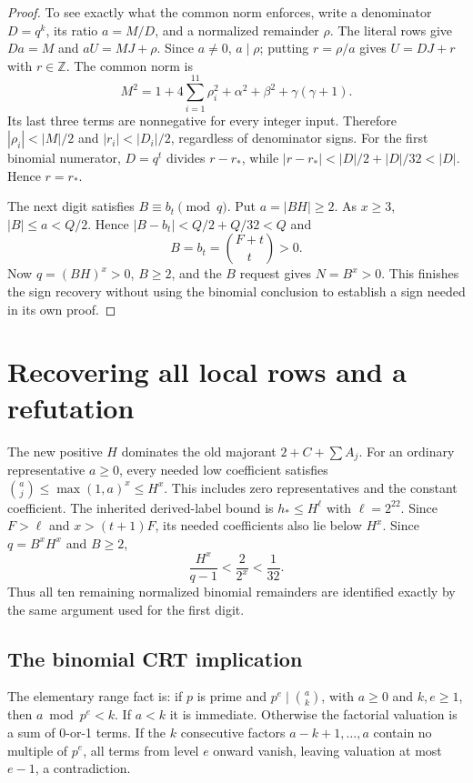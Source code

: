 \documentclass[11pt]{article}
\begin{document}
\begin{proof}
To see exactly what the common norm enforces, write a denominator
$D=q^k$, its ratio $a=M/D$, and a normalized remainder $\rho$.
The literal rows give $Da=M$ and $aU=MJ+\rho$. Since $a\ne0$,
$a\mid\rho$; putting $r=\rho/a$ gives $U=DJ+r$ with $r\in\mathbb Z$.
The common norm is
\begin{equation}\label{eq:common}
 M^2=1+4\sum_{i=1}^{11}\rho_i^2+\alpha^2+\beta^2+\gamma(\gamma+1).
\end{equation}
Its last three terms are nonnegative for every integer input. Therefore
$|\rho_i|<|M|/2$ and $|r_i|<|D_i|/2$, regardless of denominator signs.
For the first binomial numerator, $D=q^t$ divides $r-r_*$, while
$|r-r_*|<|D|/2+|D|/32<|D|$. Hence $r=r_*$.

The next digit satisfies $B\equiv b_t\pmod q$. Put $a=|BH|\ge2$.
As $x\ge3$, $|B|\le a<Q/2$. Hence
$|B-b_t|<Q/2+Q/32<Q$ and
\begin{equation}\label{eq:binomial}
 B=b_t=\binom{F+t}{t}>0.
\end{equation}
Now $q=(BH)^x>0$, $B\ge2$, and the $B$ request gives $N=B^x>0$.
This finishes the sign recovery without using the binomial conclusion
to establish a sign needed in its own proof.
\end{proof}

\section{Recovering all local rows and a refutation}\label{sec:sound}

The new positive $H$ dominates the old majorant $2+C+\sum A_j$.
For an ordinary representative $a\ge0$, every needed low coefficient
satisfies $\binom aj\le\max(1,a)^x\le H^x$. This includes zero
representatives and the constant coefficient. The inherited derived-label
bound is $h_*\le H^{\ell}$ with $\ell=2^{22}$. Since $F>\ell$ and
$x>(t+1)F$, its needed coefficients also lie below $H^x$.
Since $q=B^xH^x$ and $B\ge2$,
\[
 \frac{H^x}{q-1}<\frac{2}{2^x}<\frac1{32}.
\]
Thus all ten remaining normalized binomial remainders are identified
exactly by the same argument used for the first digit.

\subsection{The binomial CRT implication}

The elementary range fact is: if $p$ is prime and $p^e\mid\binom ak$, with $a\ge0$ and
$k,e\ge1$, then $a\bmod p^e<k$. If $a<k$ it is immediate. Otherwise
the factorial valuation is a sum of 0-or-1 terms. If the $k$ consecutive
factors $a-k+1,\ldots,a$ contain no multiple of $p^e$, all terms from
level $e$ onward vanish, leaving valuation at most $e-1$, a contradiction.
\end{document}
